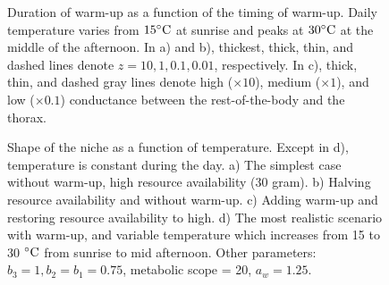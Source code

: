 \vspace{-1.5cm}
%
\begin{figure}[H]
\begin{center}
\caption{
	Duration of warm-up as a function of the timing of warm-up.
	Daily temperature varies from $15 ^{\circ}\rm{C}$ at sunrise  and peaks at $30 ^{\circ}\rm{C}$ at the middle of the afternoon.
	In a) and b), thickest, thick, thin, and dashed lines denote  $z = 10, 1, 0.1, 0.01$,  respectively.
	In c), thick, thin, and dashed gray lines denote high ($\times 10$), medium ($\times 1$), and low ($\times 0.1$) conductance between the rest-of-the-body and the thorax.
}%
\label{fig4}
\end{center}
\end{figure}
\vspace{-1.5cm}
%
\begin{figure}[H]
\begin{center}
\caption{
	Shape of the niche as a function of temperature.
	Except in d),  temperature is constant during the day.
	a) The simplest case without warm-up, high resource availability (30 gram).
	b) Halving resource availability and without warm-up.
	c) Adding warm-up and  restoring resource availability to high.
	d) The most realistic scenario with warm-up, and variable temperature  which increases from 15 to 30 $^{\circ} \rm{C}$ from sunrise to mid afternoon.
Other parameters: $b_3 = 1, b_2 = b_1  = 0.75$, metabolic scope = 20, $a_w = 1.25$.
}%
\label{fig5}
\end{center}
\end{figure}
%
